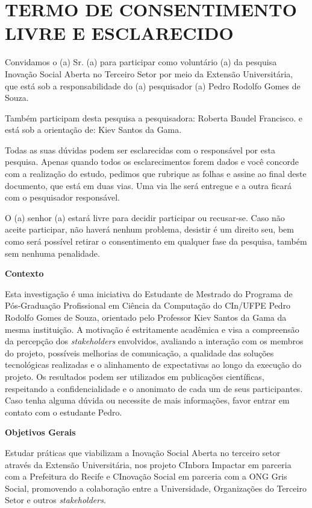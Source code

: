 \chapter{TERMO DE CONSENTIMENTO LIVRE E ESCLARECIDO}

Convidamos o (a) Sr. (a) para participar como voluntário (a) da pesquisa Inovação Social Aberta no Terceiro Setor por meio da Extensão Universitária, que está sob a responsabilidade do (a) pesquisador (a) Pedro Rodolfo Gomes de Souza.

Também participam desta pesquisa a pesquisadora: Roberta Baudel Francisco. e está sob a orientação de: Kiev Santos da Gama.

Todas as suas dúvidas podem ser esclarecidas com o responsável por esta pesquisa. Apenas quando todos os esclarecimentos forem dados e você concorde com a realização do estudo, pedimos que rubrique as folhas e assine ao final deste documento, que está em duas vias. Uma via lhe será entregue e a outra ficará com o pesquisador responsável.

O (a) senhor (a) estará livre para decidir participar ou recusar-se. Caso não aceite participar, não haverá nenhum problema, desistir é um direito seu, bem como será possível retirar o consentimento em qualquer fase da pesquisa, também sem nenhuma penalidade.

\textbf{Contexto}

Esta investigação é uma iniciativa do Estudante de Mestrado do Programa de Pós-Graduação Profissional em Ciência da Computação do CIn/UFPE Pedro Rodolfo Gomes de Souza, orientado pelo Professor Kiev Santos da Gama da mesma instituição. A motivação é estritamente acadêmica e visa a compreensão da percepção dos \textit{stakeholders} envolvidos, avaliando a interação com os membros do projeto, possíveis melhorias de comunicação, a qualidade das soluções tecnológicas realizadas e o alinhamento de expectativas ao longo da execução do projeto. Os resultados podem ser utilizados em publicações científicas, respeitando a confidencialidade e o anonimato de cada um de seus participantes. Caso tenha alguma dúvida ou necessite de mais informações, favor entrar em contato com o estudante Pedro.

\textbf{Objetivos Gerais}

Estudar práticas que viabilizam a Inovação Social Aberta no terceiro setor através da Extensão Universitária, nos projeto CInbora Impactar em parceria com a Prefeitura do Recife e CInovação Social em parceria com a \gls{ONG} Gris Social, promovendo a colaboração entre a Universidade, Organizações do Terceiro Setor e outros \textit{stakeholders}.

